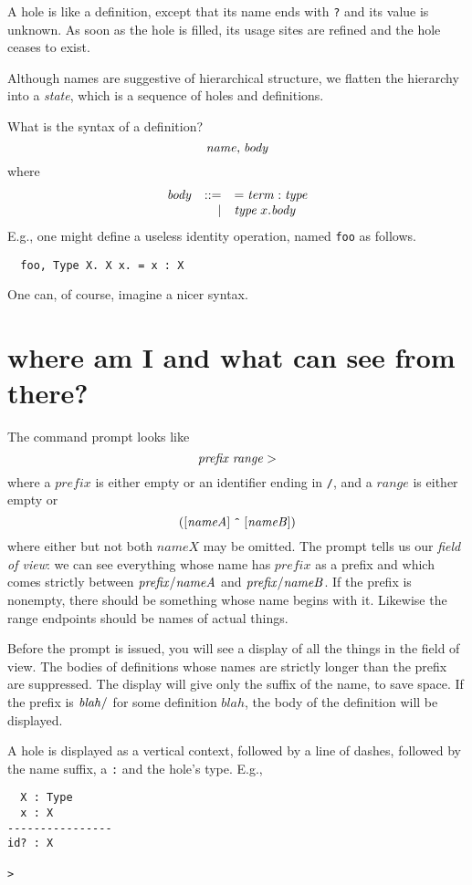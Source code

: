 \documentclass{article}
\begin{document}
A hole is like a definition, except that its name ends with {\tt ?} and its value is unknown. As soon as the hole is filled, its usage sites are refined and the hole ceases to exist.

Although names are suggestive of hierarchical structure, we flatten the
hierarchy into a \emph{state}, which is a sequence of holes and definitions.

What is the syntax of a definition?
\[
  \mathit{name}{\tt ,}\;\mathit{body}
\]
where
\[\begin{array}{rrl}
\mathit{body} & ::= & {\tt =}\;\mathit{term}\;{\tt :}\;\mathit{type} \\
              &   | & \mathit{type}\;x.\mathit{body} \\
\end{array}\]
E.g., one might define a useless identity operation, named {\tt foo} as follows.
\begin{verbatim}
  foo, Type X. X x. = x : X
\end{verbatim}

One can, of course, imagine a nicer syntax.


\section{where am I and what can see from there?}

The command prompt looks like
\[
  \mathit{prefix}\;\mathit{range}\;{\tt>}
\]
where a $\mathit{prefix}$ is either empty or an identifier ending in {\tt /}, and a
$\mathit{range}$ is either empty or
\[
  {\tt (}[\mathit{nameA}]\;\mbox{\tt \^{}}\;[\mathit{nameB}]{\tt )}
\]
where either but not both $\mathit{nameX}$ may be omitted.
The prompt tells us our \emph{field of view}: we can see everything whose name
has $\mathit{prefix}$ as a prefix and which comes strictly between $\mathit{prefix}{\tt /}\mathit{nameA}$ and $\mathit{prefix}{\tt /}\mathit{nameB}$. If the prefix is nonempty, there should be something whose name begins with it. Likewise the range endpoints should be
names of actual things.

Before the prompt is issued, you will see a display of all the things in the field of view. The bodies of definitions whose names are strictly longer than the prefix are suppressed.
The display will give only the suffix of the name, to save space.
If the prefix is $\mathit{blah}{\tt /}$ for some definition $\mathit{blah}$, the body
of the definition will be displayed.

A hole is displayed as a vertical context, followed by a line of dashes, followed by
the name suffix, a {\tt :} and the hole's type. E.g.,
\begin{verbatim}
  X : Type
  x : X
----------------
id? : X

>
\end{verbatim}
\end{document}

